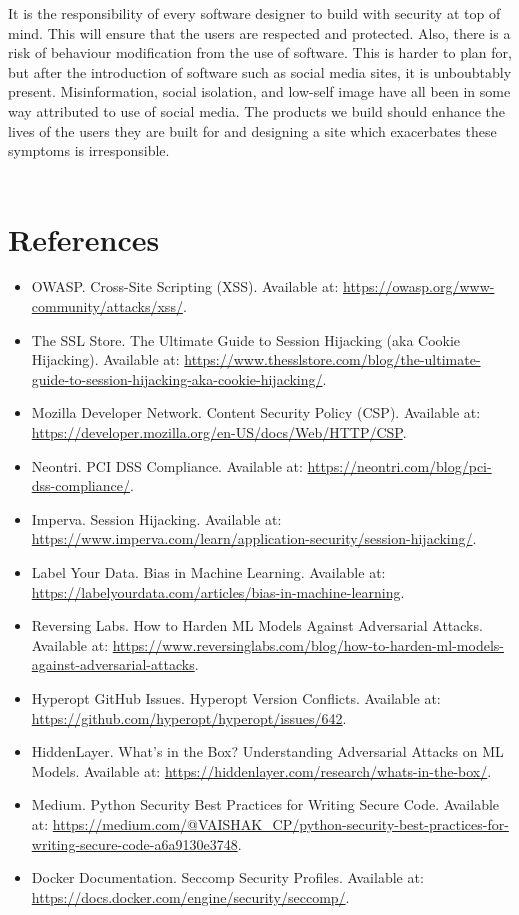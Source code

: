 \documentclass{article}
\begin{document}
\begin{enumerate}
    It is the responsibility of every software designer to build with security at top of mind. This will ensure that the users are respected and protected.
    Also, there is a risk of behaviour modification from the use of software. This is harder to plan for, but after the introduction of software such as social media sites, it is unboubtably present.
    Misinformation, social isolation, and low-self image have all been in some way attributed to use of social media. The products we build should enhance the lives of the users they are built for
    and designing a site which exacerbates these symptoms is irresponsible.
    \\\\

\end{enumerate}
\newpage
\section{References}
\sloppy

\begin{itemize}
    \item OWASP. Cross-Site Scripting (XSS). Available at: \url{https://owasp.org/www-community/attacks/xss/}.
    \item The SSL Store. The Ultimate Guide to Session Hijacking (aka Cookie Hijacking). Available at: \url{https://www.thesslstore.com/blog/the-ultimate-guide-to-session-hijacking-aka-cookie-hijacking/}.
    \item Mozilla Developer Network. Content Security Policy (CSP). Available at: \url{https://developer.mozilla.org/en-US/docs/Web/HTTP/CSP}.
    \item Neontri. PCI DSS Compliance. Available at: \url{https://neontri.com/blog/pci-dss-compliance/}.
    \item Imperva. Session Hijacking. Available at: \url{https://www.imperva.com/learn/application-security/session-hijacking/}.
    \item Label Your Data. Bias in Machine Learning. Available at: \url{https://labelyourdata.com/articles/bias-in-machine-learning}.
    \item Reversing Labs. How to Harden ML Models Against Adversarial Attacks. Available at: \url{https://www.reversinglabs.com/blog/how-to-harden-ml-models-against-adversarial-attacks}.
    \item Hyperopt GitHub Issues. Hyperopt Version Conflicts. Available at: \url{https://github.com/hyperopt/hyperopt/issues/642}.
    \item HiddenLayer. What's in the Box? Understanding Adversarial Attacks on ML Models. Available at: \url{https://hiddenlayer.com/research/whats-in-the-box/}.
    \item Medium. Python Security Best Practices for Writing Secure Code. Available at: \url{https://medium.com/@VAISHAK_CP/python-security-best-practices-for-writing-secure-code-a6a9130e3748}.
    \item Docker Documentation. Seccomp Security Profiles. Available at: \url{https://docs.docker.com/engine/security/seccomp/}.
\end{itemize}
\sloppy
\end{document}
